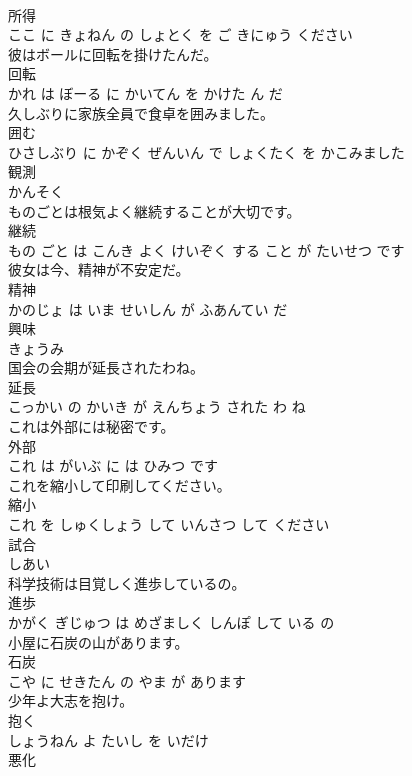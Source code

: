 \documentclass[8pt]{extreport}
\begin{document}
\begin{CJK}{UTF8}{min}
\\	所得 
\\	ここ に きょねん の しょとく を ご きにゅう ください		
\\	彼はボールに回転を掛けたんだ。	
\\	回転 
\\	かれ は ぼーる に かいてん を かけた ん だ		
\\	久しぶりに家族全員で食卓を囲みました。	
\\	囲む 
\\	ひさしぶり に かぞく ぜんいん で しょくたく を かこみました		
\\	観測	
\\	かんそく		
\\	ものごとは根気よく継続することが大切です。	
\\	継続 
\\	もの ごと は こんき よく けいぞく する こと が たいせつ です		
\\	彼女は今、精神が不安定だ。	
\\	精神 
\\	かのじょ は いま せいしん が ふあんてい だ		
\\	興味	
\\	きょうみ		
\\	国会の会期が延長されたわね。	
\\	延長 
\\	こっかい の かいき が えんちょう された わ ね		
\\	これは外部には秘密です。	
\\	外部 
\\	これ は がいぶ に は ひみつ です		
\\	これを縮小して印刷してください。	
\\	縮小 
\\	これ を しゅくしょう して いんさつ して ください		
\\	試合	
\\	しあい		
\\	科学技術は目覚しく進歩しているの。	
\\	進歩 
\\	かがく ぎじゅつ は めざましく しんぽ して いる の		
\\	小屋に石炭の山があります。	
\\	石炭 
\\	こや に せきたん の やま が あります		
\\	少年よ大志を抱け。	
\\	抱く 
\\	しょうねん よ たいし を いだけ		
\\	悪化	

\end{CJK}
\end{document}
